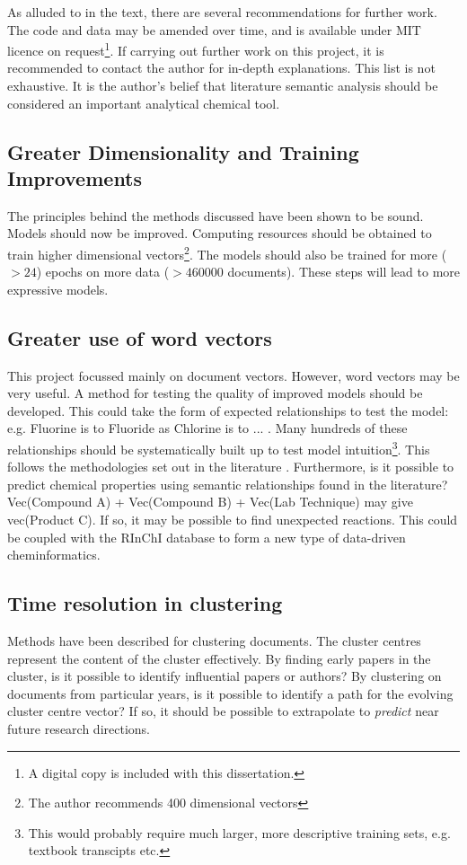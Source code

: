 \label{chapt:RECOMMENDATIONS}
As alluded to in the text, there are several recommendations for further work. The code and data may be amended over time, and is available under MIT licence on request\footnote{A digital copy is included with this dissertation.}. If carrying out further work on this project, it is recommended to contact the author for in-depth explanations. This list is not exhaustive. It is the author's belief that literature semantic analysis should be considered an important analytical chemical tool.
\subsection{Greater Dimensionality and Training Improvements}
The principles behind the methods discussed have been shown to be sound. Models should now be improved. Computing resources should be obtained to train higher dimensional vectors\footnote{ The author recommends 400 dimensional vectors}. The models should also be trained for more ($> 24$) epochs on more data ($> 460000$ documents). These steps will lead to more expressive models.
\subsection{Greater use of word vectors}
\label{sec:recomm_word_vectors}
This project focussed mainly on document vectors. However, word vectors may be very useful. A method for testing the quality of improved models should be developed. This could take the form of expected relationships to test the model: e.g. Fluorine is to Fluoride as Chlorine is to ... . Many hundreds of these relationships should be systematically built up to test model intuition\footnote{This would probably require much larger, more descriptive training sets, e.g. textbook transcipts etc.}. This follows the methodologies set out in the literature \cite{word2vec1} \cite{word2vec2}. Furthermore, is it possible to predict chemical properties using semantic relationships found in the literature? Vec(Compound A) + Vec(Compound B) + Vec(Lab Technique) may give vec(Product C). If so, it may be possible to find unexpected reactions. This could be coupled with the RInChI database to form a new type of data-driven cheminformatics.
\subsection{Time resolution in clustering}
Methods have been described for clustering documents. The cluster centres represent the content of the cluster effectively. By finding early papers in the cluster, is it possible to identify influential papers or authors?
By clustering on documents from particular years, is it possible to identify a path for the evolving cluster centre vector? If so, it should be possible to extrapolate to \emph{predict} near future research directions.
